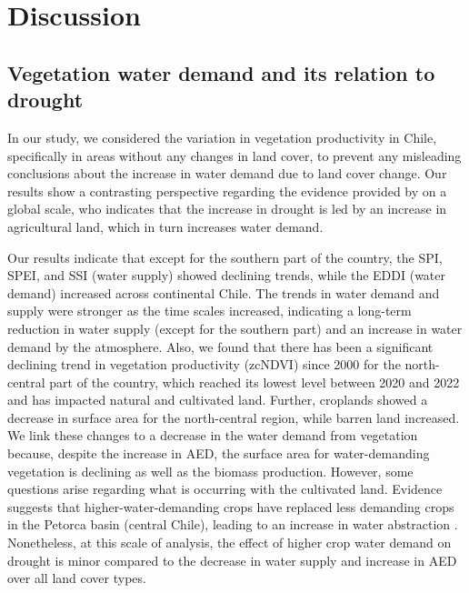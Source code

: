 \documentclass[
  authoryear,
  preprint,
  3p,
  onecolumn]{elsarticle}
\begin{document}
\hypertarget{discussion}{%
\section{Discussion}\label{discussion}}

\hypertarget{vegetation-water-demand-and-its-relation-to-drought}{%
\subsection{Vegetation water demand and its relation to
drought}\label{vegetation-water-demand-and-its-relation-to-drought}}

In our study, we considered the variation in vegetation productivity in
Chile, specifically in areas without any changes in land cover, to
prevent any misleading conclusions about the increase in water demand
due to land cover change. Our results show a contrasting perspective
regarding the evidence provided by \citet{Vicente-Serrano2022} on a
global scale, who indicates that the increase in drought is led by an
increase in agricultural land, which in turn increases water demand.

Our results indicate that except for the southern part of the country,
the SPI, SPEI, and SSI (water supply) showed declining trends, while the
EDDI (water demand) increased across continental Chile. The trends in
water demand and supply were stronger as the time scales increased,
indicating a long-term reduction in water supply (except for the
southern part) and an increase in water demand by the atmosphere. Also,
we found that there has been a significant declining trend in vegetation
productivity (zcNDVI) since 2000 for the north-central part of the
country, which reached its lowest level between 2020 and 2022 and has
impacted natural and cultivated land. Further, croplands showed a
decrease in surface area for the north-central region, while barren land
increased. We link these changes to a decrease in the water demand from
vegetation because, despite the increase in AED, the surface area for
water-demanding vegetation is declining as well as the biomass
production. However, some questions arise regarding what is occurring
with the cultivated land. Evidence suggests that higher-water-demanding
crops have replaced less demanding crops in the Petorca basin (central
Chile), leading to an increase in water abstraction
\citep{Munoz2020, Duran2020}. Nonetheless, at this scale of analysis,
the effect of higher crop water demand on drought is minor compared to
the decrease in water supply and increase in AED over all land cover
types.
\end{document}
